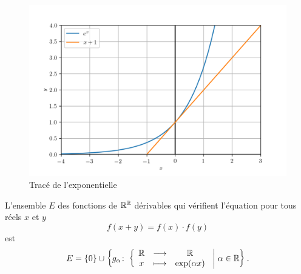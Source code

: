 \begin{figure}
  \centering
  \includegraphics[scale=0.8]{exp.png}
  \caption{Tracé de l'exponentielle}
  \label{fig:traceexp}
\end{figure}
%
\begin{theo}
  L'ensemble \(E\) des fonctions de \(\mathbb{R}^{\mathbb{R}}\) dérivables qui vérifient l'équation pour tous réels \(x\) et \(y\)
  \begin{equation}
    \label{eq:foncexp}
    f(x+y)=f(x) \cdot f(y)
  \end{equation}
  est
  \begin{equation}
    E=\left\{0\right\} \cup \left\{g_{\alpha}\colon \left\{\begin{array}{ccc} \mathbb{R} & \longrightarrow &\mathbb{R}\\ x & \longmapsto & \exp(\alpha x) \end{array} \right.\mathrel{}\middle|\mathrel{}\alpha \in \mathbb{R}\right\}.
  \end{equation}
\end{theo}
